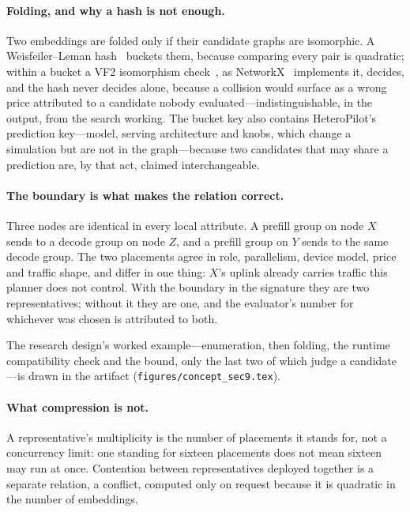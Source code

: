 \paragraph{Folding, and why a hash is not enough.}
Two embeddings are folded only if their candidate graphs are isomorphic. A
Weisfeiler--Leman hash~\cite{wlkernel} buckets them, because comparing every
pair is quadratic; within a bucket a VF2 isomorphism check~\cite{vf2}, as
NetworkX~\cite{networkx} implements it, decides, and the hash never
decides alone, because a collision would surface as a wrong price attributed
to a candidate nobody evaluated---indistinguishable, in the output, from the
search working. The bucket key also contains HeteroPilot's prediction
key---model, serving architecture and knobs, which change a simulation but are
not in the graph---because two candidates that may share a prediction are, by
that act, claimed interchangeable.

\paragraph{The boundary is what makes the relation correct.}
Three nodes are identical in every local attribute. A prefill group on node $X$
sends to a decode group on node $Z$, and a prefill group on $Y$ sends to the
same decode group. The two placements agree in role, parallelism, device
model, price and traffic shape, and differ in one thing: $X$'s uplink already
carries traffic this planner does not control. With the boundary in the
signature they are two representatives; without it they are one, and the
evaluator's number for whichever was chosen is attributed to both.

The research design's worked example---enumeration, then folding, the runtime
compatibility check and the bound, only the last two of which judge a
candidate---is drawn in the artifact (\texttt{figures/concept\_sec9.tex}).

\paragraph{What compression is not.}
A representative's multiplicity is the number of placements it stands for, not
a concurrency limit: one standing for sixteen placements does not mean sixteen
may run at once. Contention between representatives deployed together is a
separate relation, a conflict, computed only on request because it is
quadratic in the number of embeddings.
